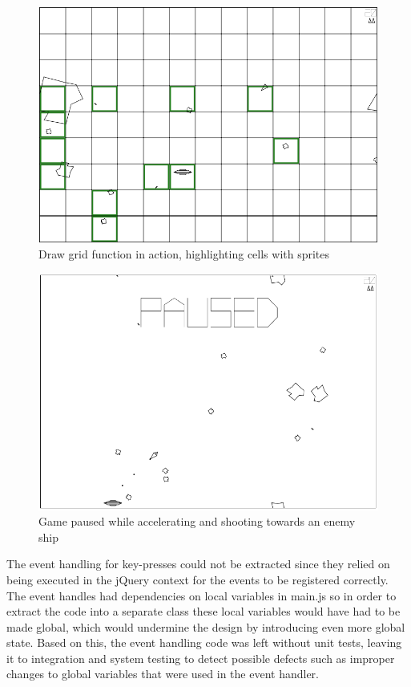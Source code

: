 \documentclass[11pt]{article}
\begin{document}
\begin{figure}[ht!]
\centering
\includegraphics[width=1.0\textwidth]{pics/game8.png}
\caption{Draw grid function in action, highlighting cells with sprites}
\label{fig:game8}
\end{figure}

\begin{figure}[h!]
\centering
\includegraphics[width=1.0\textwidth]{pics/game10.png}
\caption{Game paused while accelerating and shooting towards an enemy ship}
\label{fig:game10}
\end{figure}

The event handling for key-presses could not be extracted since they relied on being executed in the jQuery context for the events to be registered correctly. The event handles had dependencies on local variables in main.js so in order to extract the code into a separate class these local variables would have had to be made global, which would undermine the design by introducing even more global state. Based on this, the event handling code was left without unit tests, leaving it to integration and system testing to detect possible defects such as improper changes to global variables that were used in the event handler.
\end{document}
